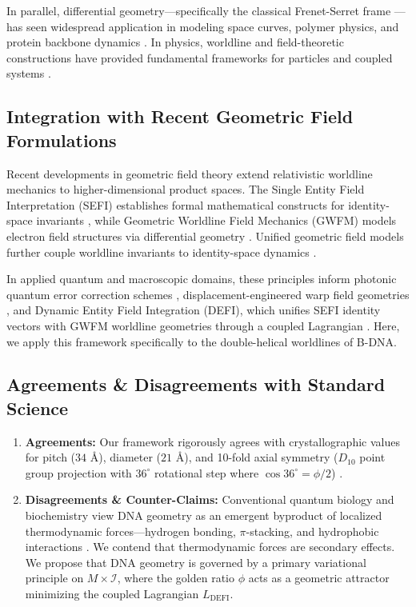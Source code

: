 \documentclass[11pt,a4paper]{article}
\begin{document}
In parallel, differential geometry—specifically the classical Frenet-Serret frame \cite{frenet1852, serret1851}—has seen widespread application in modeling space curves, polymer physics, and protein backbone dynamics \cite{kamien2002}. In physics, worldline and field-theoretic constructions have provided fundamental frameworks for particles and coupled systems \cite{feynman1950, schwinger1951}.

\subsection{Integration with Recent Geometric Field Formulations}
Recent developments in geometric field theory extend relativistic worldline mechanics to higher-dimensional product spaces. The Single Entity Field Interpretation (SEFI) establishes formal mathematical constructs for identity-space invariants \cite{dutton2026sefi}, while Geometric Worldline Field Mechanics (GWFM) models electron field structures via differential geometry \cite{dutton2026gwfm}. Unified geometric field models further couple worldline invariants to identity-space dynamics \cite{dutton2026unified}.

In applied quantum and macroscopic domains, these principles inform photonic quantum error correction schemes \cite{dutton2026photonic}, displacement-engineered warp field geometries \cite{dutton2026warp}, and Dynamic Entity Field Integration (DEFI), which unifies SEFI identity vectors with GWFM worldline geometries through a coupled Lagrangian \cite{dutton2026defi}. Here, we apply this framework specifically to the double-helical worldlines of B-DNA.

\subsection{Agreements \& Disagreements with Standard Science}
\begin{enumerate}
    \item \textbf{Agreements:} Our framework rigorously agrees with crystallographic values for pitch ($34\text{ \AA}$), diameter ($21\text{ \AA}$), and 10-fold axial symmetry ($D_{10}$ point group projection with $36^\circ$ rotational step where $\cos 36^\circ = \phi/2$) \cite{saenger1984}.
    \item \textbf{Disagreements \& Counter-Claims:} Conventional quantum biology and biochemistry view DNA geometry as an emergent byproduct of localized thermodynamic forces—hydrogen bonding, $\pi$-stacking, and hydrophobic interactions \cite{zwanenburg2020}. We contend that thermodynamic forces are secondary effects. We propose that DNA geometry is governed by a primary variational principle on $M \times \mathcal{I}$, where the golden ratio $\phi$ acts as a geometric attractor minimizing the coupled Lagrangian $L_{\text{DEFI}}$.
\end{enumerate}
\end{document}
